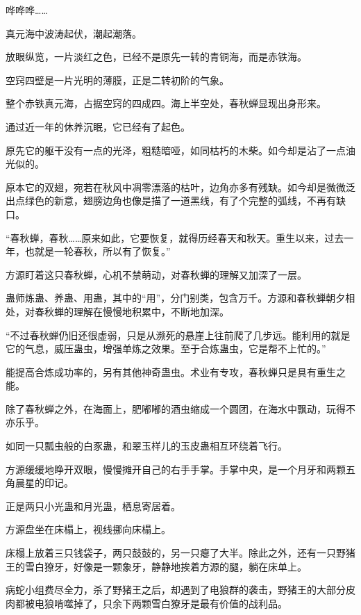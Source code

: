 
\begin{this_body}



哗哗哗……

真元海中波涛起伏，潮起潮落。

放眼纵览，一片淡红之色，已经不是原先一转的青铜海，而是赤铁海。

空窍四壁是一片光明的薄膜，正是二转初阶的气象。

整个赤铁真元海，占据空窍的四成四。海上半空处，春秋蝉显现出身形来。

通过近一年的休养沉眠，它已经有了起色。

原先它的躯干没有一点的光泽，粗糙暗哑，如同枯朽的木柴。如今却是沾了一点油光似的。

原本它的双翅，宛若在秋风中凋零漂落的枯叶，边角亦多有残缺。如今却是微微泛出点绿色的新意，翅膀边角也像是描了一道黑线，有了个完整的弧线，不再有缺口。

“春秋蝉，春秋……原来如此，它要恢复，就得历经春天和秋天。重生以来，过去一年，也就是一轮春秋，所以有了恢复。”

方源盯着这只春秋蝉，心机不禁萌动，对春秋蝉的理解又加深了一层。

蛊师炼蛊、养蛊、用蛊，其中的“用”，分门别类，包含万千。方源和春秋蝉朝夕相处，对春秋蝉的理解在慢慢地积累中，不断地加深。

“不过春秋蝉仍旧还很虚弱，只是从濒死的悬崖上往前爬了几步远。能利用的就是它的气息，威压蛊虫，增强单炼之效果。至于合炼蛊虫，它是帮不上忙的。”

能提高合炼成功率的，另有其他神奇蛊虫。术业有专攻，春秋蝉只是具有重生之能。

除了春秋蝉之外，在海面上，肥嘟嘟的酒虫缩成一个圆团，在海水中飘动，玩得不亦乐乎。

如同一只瓢虫般的白豕蛊，和翠玉样儿的玉皮蛊相互环绕着飞行。

方源缓缓地睁开双眼，慢慢摊开自己的右手手掌。手掌中央，是一个月牙和两颗五角晨星的印记。

正是两只小光蛊和月光蛊，栖息寄居着。

方源盘坐在床榻上，视线挪向床榻上。

床榻上放着三只钱袋子，两只鼓鼓的，另一只瘪了大半。除此之外，还有一只野猪王的雪白獠牙，好像是一颗象牙，静静地挨着方源的腿，躺在床单上。

病蛇小组费尽全力，杀了野猪王之后，却遇到了电狼群的袭击，野猪王的大部分皮肉都被电狼啃噬掉了，只余下两颗雪白獠牙是最有价值的战利品。


\end{this_body}
